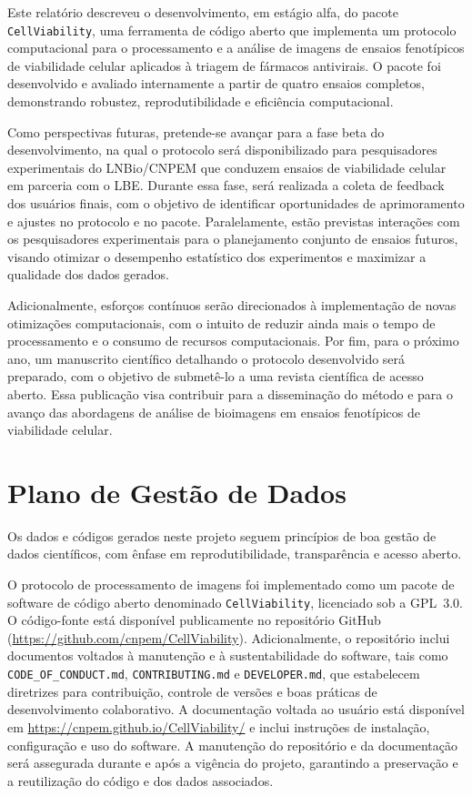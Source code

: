 \documentclass[12pt]{article}
\begin{document}
Este relatório descreveu o desenvolvimento, em estágio alfa, do pacote \texttt{CellViability}, uma ferramenta de código aberto que implementa um protocolo computacional para o processamento e a análise de imagens de ensaios fenotípicos de viabilidade celular aplicados à triagem de fármacos antivirais. O pacote foi desenvolvido e avaliado internamente a partir de quatro ensaios completos, demonstrando robustez, reprodutibilidade e eficiência computacional.

Como perspectivas futuras, pretende-se avançar para a fase beta do desenvolvimento, na qual o protocolo será disponibilizado para pesquisadores experimentais do LNBio/CNPEM que conduzem ensaios de viabilidade celular em parceria com o LBE. Durante essa fase, será realizada a coleta de feedback dos usuários finais, com o objetivo de identificar oportunidades de aprimoramento e ajustes no protocolo e no pacote. Paralelamente, estão previstas interações com os pesquisadores experimentais para o planejamento conjunto de ensaios futuros, visando otimizar o desempenho estatístico dos experimentos e maximizar a qualidade dos dados gerados.

Adicionalmente, esforços contínuos serão direcionados à implementação de novas otimizações computacionais, com o intuito de reduzir ainda mais o tempo de processamento e o consumo de recursos computacionais. Por fim, para o próximo ano, um manuscrito científico detalhando o protocolo desenvolvido será preparado, com o objetivo de submetê-lo a uma revista científica de acesso aberto. Essa publicação visa contribuir para a disseminação do método e para o avanço das abordagens de análise de bioimagens em ensaios fenotípicos de viabilidade celular.

\section{Plano de Gestão de Dados}

Os dados e códigos gerados neste projeto seguem princípios de boa gestão de dados científicos, com ênfase em reprodutibilidade, transparência e acesso aberto.

O protocolo de processamento de imagens foi implementado como um pacote de software de código aberto denominado \texttt{CellViability}, licenciado sob a GPL~3.0. O código-fonte está disponível publicamente no repositório GitHub (\url{https://github.com/cnpem/CellViability}). Adicionalmente, o repositório inclui documentos voltados à manutenção e à sustentabilidade do software, tais como \texttt{CODE\_OF\_CONDUCT.md}, \texttt{CONTRIBUTING.md} e \texttt{DEVELOPER.md}, que estabelecem diretrizes para contribuição, controle de versões e boas práticas de desenvolvimento colaborativo. A documentação voltada ao usuário está disponível em \url{https://cnpem.github.io/CellViability/} e inclui instruções de instalação, configuração e uso do software. A manutenção do repositório e da documentação será assegurada durante e após a vigência do projeto, garantindo a preservação e a reutilização do código e dos dados associados.
\end{document}
